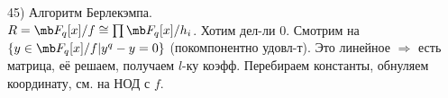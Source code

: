 45) Алгоритм Берлекэмпа.\\
$R=\mb F_q[x]/f \cong \prod \mb F_q[x]/h_i$. Хотим дел-ли 0. Смотрим на $\{y\in \mb F_q[x]/f | y^q-y=0 \}$ (покомпонентно удовл-т). Это линейное $\Rightarrow$ есть матрица, её решаем, получаем $l$-ку коэфф. Перебираем константы, обнуляем координату, см. на НОД с $f$.\\
